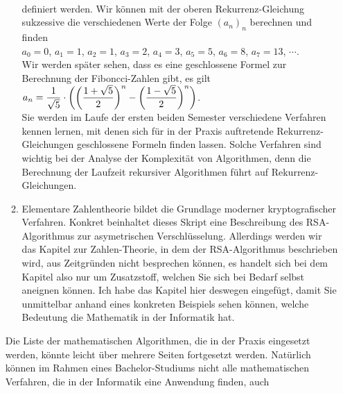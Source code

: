 \begin{enumerate}
\begin{enumerate}
            \\[0.2cm]
            definiert werden.  Wir k\"{o}nnen mit der oberen Rekurrenz-Gleichung sukzessive die verschiedenen
            Werte der Folge $(a_n)_n$ berechnen und finden 
            \\[0.2cm]
            \hspace*{1.3cm}
            $a_0 = 0$, $a_1 = 1$, $a_2 = 1$, $a_3 = 2$, $a_4 = 3$, $a_5 = 5$, $a_6 = 8$, $a_7 = 13$, $\cdots$.
            \\[0.2cm]
            Wir werden sp\"{a}ter sehen, dass es eine geschlossene Formel zur Berechnung der Fiboncci-Zahlen
            gibt, es gilt
            \\[0.2cm]
            \hspace*{1.3cm}
            $\displaystyle a_n = \frac{1}{\sqrt{5}} \cdot 
            \left( 
                  \biggl(\frac{1 + \sqrt{5}}{2}\biggr)^n - \biggl(\frac{1 - \sqrt{5}}{2}\biggr)^n 
            \right)
            $.
            \\[0.2cm]
            Sie werden im Laufe der ersten beiden Semester verschiedene Verfahren kennen lernen, mit
            denen sich f\"{u}r in der Praxis auftretende Rekurrenz-Gleichungen geschlossene Formeln
            finden lassen.  Solche Verfahren sind wichtig bei der Analyse der Komplexit\"{a}t von
            Algorithmen, denn die Berechnung der Laufzeit rekursiver Algorithmen f\"{u}hrt auf
            Rekurrenz-Gleichungen.   
      \item Elementare Zahlentheorie bildet die Grundlage moderner kryptografischer Verfahren.
            Konkret beinhaltet dieses Skript eine Beschreibung des RSA-Algorithmus zur asymetrischen
            Verschl\"{u}sselung.  Allerdings werden wir das Kapitel zur Zahlen-Theorie, in dem der 
            RSA-Algorithmus beschrieben wird, aus Zeitgr\"{u}nden nicht besprechen k\"{o}nnen, es handelt
            sich bei dem Kapitel also nur um Zusatzstoff, welchen Sie sich bei Bedarf selbst aneignen
            k\"{o}nnen.  Ich habe das Kapitel hier deswegen eingef\"{u}gt, damit Sie unmittelbar anhand
            eines konkreten Beispiels sehen k\"{o}nnen, welche Bedeutung die Mathematik in der
            Informatik hat.
      \end{enumerate}
      Die Liste der mathematischen Algorithmen, die in der Praxis eingesetzt werden, k\"{o}nnte leicht
      \"{u}ber mehrere Seiten fortgesetzt werden.  Nat\"{u}rlich k\"{o}nnen im Rahmen eines Bachelor-Studiums
      nicht alle mathematischen Verfahren, die in der Informatik eine Anwendung finden, auch

\end{enumerate}
